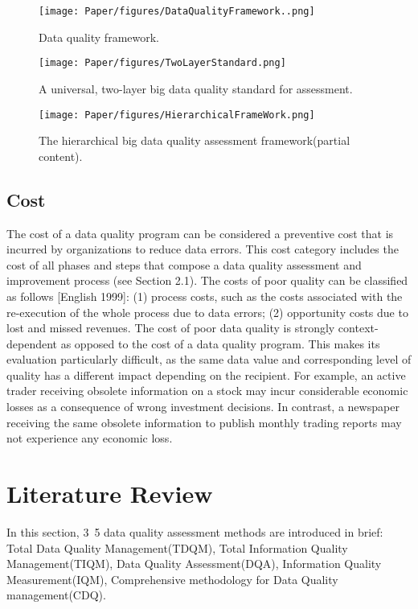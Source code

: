 \documentclass[pdftex,english,oribibl]{llncs}
\begin{document}
  \begin{figure}
    \centering
    \texttt{[image: Paper/figures/DataQualityFramework..png]}
    \caption{Data quality framework.}
    \label{fig:dataqualityframework}
  \end{figure}

  \begin{figure}
    \centering
    \texttt{[image: Paper/figures/TwoLayerStandard.png]}
    \caption{A universal, two-layer big data quality standard for assessment.}
    \label{fig:twolayerstandard}
  \end{figure}

\begin{figure}
    \centering
    \texttt{[image: Paper/figures/HierarchicalFrameWork.png]}
    \caption{The hierarchical big data quality assessment framework(partial content).}
    \label{fig:hierachicalframwork}
 \end{figure}



\subsection{Cost}
The cost of a data quality program can be considered a preventive cost that is incurred by organizations to reduce data errors. This cost category includes the cost of all phases and steps that compose a data quality assessment and improvement process (see Section 2.1).
 The costs of poor quality can be classified as follows [English 1999]:
 (1) process costs, such as the costs associated with the re-execution of the whole process due to data errors;
 (2) opportunity costs due to lost and missed revenues.
 The cost of poor data quality is strongly context-dependent as opposed to the cost of a data quality program. This makes its evaluation particularly difficult, as the same data value and corresponding level of quality has a different impact depending on the recipient. For example, an active trader receiving obsolete information on a stock may incur considerable economic losses as a consequence of wrong investment decisions. In contrast, a newspaper receiving the same obsolete information to publish monthly trading reports may not experience any economic loss.


\section{Literature Review}
In this section, 3~5 data quality assessment methods are introduced in brief:
Total Data Quality Management(TDQM),
Total Information Quality Management(TIQM),
Data Quality Assessment(DQA),
Information Quality Measurement(IQM),
Comprehensive methodology for Data Quality management(CDQ).
\end{document}

